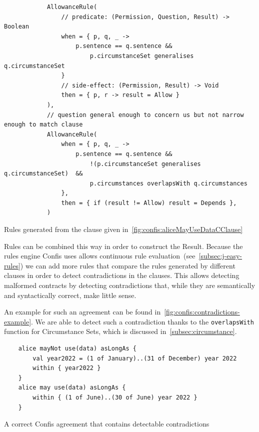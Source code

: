 \begin{listing}[h]
    \centering
    \begin{verbatim}
            AllowanceRule(
                // predicate: (Permission, Question, Result) -> Boolean
                when = { p, q, _ ->
                    p.sentence == q.sentence &&
                        p.circumstanceSet generalises q.circumstanceSet
                }
                // side-effect: (Permission, Result) -> Void
                then = { p, r -> result = Allow }
            ),
            // question general enough to concern us but not narrow enough to match clause
            AllowanceRule(
                when = { p, q, _ ->
                    p.sentence == q.sentence &&
                        !(p.circumstanceSet generalises q.circumstanceSet)  &&
                        p.circumstances overlapsWith q.circumstances
                },
                then = { if (result != Allow) result = Depends },
            )
    \end{verbatim}
    \caption{Rules generated from the clause given in~\autoref{fig:confis:aliceMayUseDataCClause}}
    \label{fig:confis:aliceMayUseDataRule}
\end{listing}

Rules can be combined this way in order to construct the Result.
Because the rules engine Confis uses allows continuous rule evaluation~(see~\autoref{subsec:j-easy-rules}) we can add more rules that compare the rules generated by different clauses in order to detect contradictions in the clauses.
This allows detecting malformed contracts by detecting contradictions that, while they are semantically and syntactically correct, make little sense.

An example for such an agreement can be found in~\autoref{fig:confis:contradictions-example}.
We are able to detect such a contradiction thanks to the \texttt{overlapsWith} function for Circumstance Sets, which is discussed in~\autoref{subsec:circumstance}.


\begin{listing}[h]
    \centering
    \begin{verbatim}
    alice mayNot use(data) asLongAs {
        val year2022 = (1 of January)..(31 of December) year 2022
        within { year2022 }
    }
    alice may use(data) asLongAs {
        within { (1 of June)..(30 of June) year 2022 }
    }
    \end{verbatim}
    \caption{A correct Confis agreement that contains detectable contradictions}
    \label{fig:confis:contradictions-example}
\end{listing}


